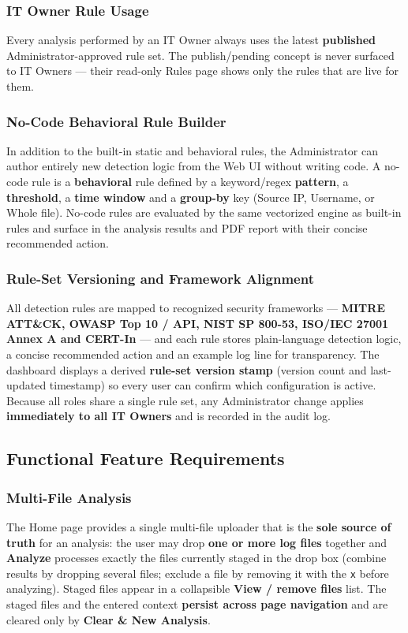 \documentclass[12pt,a4paper]{article}
\begin{document}
\subsubsection{IT Owner Rule Usage}
Every analysis performed by an IT Owner always uses the latest \textbf{published}
Administrator-approved rule set. The publish/pending concept is never surfaced to IT
Owners --- their read-only Rules page shows only the rules that are live for them.

\subsubsection{No-Code Behavioral Rule Builder}
In addition to the built-in static and behavioral rules, the Administrator can author entirely
new detection logic from the Web UI without writing code. A no-code rule is a
\textbf{behavioral} rule defined by a keyword/regex \textbf{pattern}, a \textbf{threshold}, a
\textbf{time window} and a \textbf{group-by} key (Source IP, Username, or Whole file). No-code
rules are evaluated by the same vectorized engine as built-in rules and surface in the analysis
results and PDF report with their concise recommended action.

\subsubsection{Rule-Set Versioning and Framework Alignment}
All detection rules are mapped to recognized security frameworks --- \textbf{MITRE ATT\&CK,
OWASP Top 10 / API, NIST SP 800-53, ISO/IEC 27001 Annex A and CERT-In} --- and each
rule stores plain-language detection logic, a concise recommended action and an example log
line for transparency. The dashboard displays a derived \textbf{rule-set version stamp}
(version count and last-updated timestamp) so every user can confirm which configuration is
active. Because all roles share a single rule set, any Administrator change applies
\textbf{immediately to all IT Owners} and is recorded in the audit log.

\subsection{Functional Feature Requirements}

\subsubsection{Multi-File Analysis}
The Home page provides a single multi-file uploader that is the \textbf{sole source of truth} for
an analysis: the user may drop \textbf{one or more log files} together and \textbf{Analyze}
processes exactly the files currently staged in the drop box (combine results by dropping several
files; exclude a file by removing it with the \texttt{x} before analyzing). Staged files appear in a
collapsible \textbf{View / remove files} list. The staged files and the entered context
\textbf{persist across page navigation} and are cleared only by \textbf{Clear \& New Analysis}.
\end{document}

